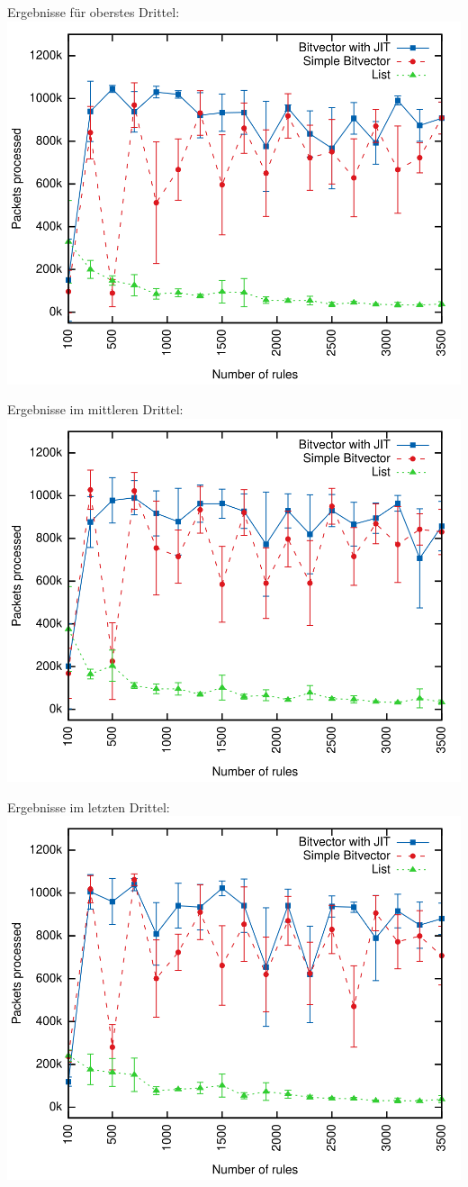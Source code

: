 \documentclass[xcolor=x11names,compress]{beamer}
\renewcommand{\(}{\begin{columns}}
\renewcommand{\)}{\end{columns}}
\newcommand{\<}[1]{\begin{column}{#1}}
\renewcommand{\>}{\end{column}}
\begin{document}
\begin{frame}[noframenumbering]
  Ergebnisse für oberstes Drittel:
  \includegraphics[height=0.9\textheight]{figures/eval_b}
\end{frame}

\begin{frame}[noframenumbering]
  Ergebnisse im mittleren Drittel:
  \includegraphics[height=0.9\textheight]{figures/eval_a}
\end{frame}

\begin{frame}[noframenumbering]
  Ergebnisse im letzten Drittel:
  \includegraphics[height=0.9\textheight]{figures/eval_w}
\end{frame}
\end{document}
